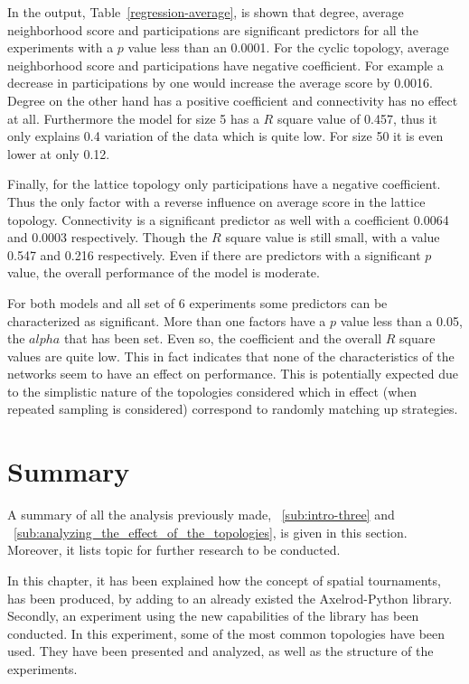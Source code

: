 In the output, Table~\ref{regression-average}, is shown that degree, average
neighborhood score and participations
are significant predictors for all the experiments with a \(p\) value less than
an 0.0001.
For the cyclic topology, average neighborhood score and participations have negative
coefficient. For example a decrease in participations by one would increase
the average score by 0.0016. Degree on the other hand has a positive coefficient
and connectivity has no effect at all. Furthermore the model for size 5 has
a \(R\) square value of 0.457, thus it only explains 0.4 variation of the data which is
quite low. For size 50 it is even lower at only 0.12.

Finally, for the lattice topology only participations have a negative coefficient.
Thus the only factor with a reverse influence on average score in the lattice topology.
Connectivity is a significant predictor as well with a coefficient 0.0064 and
0.0003 respectively. Though the \(R\) square value is still  small,
with a value 0.547 and 0.216 respectively.
Even if there are predictors with a significant \(p\) value, the overall
performance of the model is moderate.

For both models and all set of 6 experiments some predictors can be characterized
as significant. More than one factors have a \(p\) value less than a 0.05, the \(alpha\)
that has been set. Even so, the coefficient and the overall \(R\) square values are
quite low. This in fact indicates
that none of the characteristics of the networks seem to have an effect on
performance. This is potentially expected due to the simplistic nature of the
topologies considered which in effect (when repeated sampling is considered)
correspond to randomly matching up strategies.


\section{Summary}
\label{sub:summary}
A summary of all the analysis previously made, ~\autoref{sub:intro-three} and
~\autoref{sub:analyzing_the_effect_of_the_topologies}, is given in this section.
Moreover, it lists topic for further research to be conducted.

In this chapter, it has been explained how the concept of spatial tournaments,
has been produced, by adding to an already existed the Axelrod-Python library.
Secondly, an experiment using the new capabilities of the library has been
conducted. In this experiment, some of the most common topologies have been used.
They have been presented and analyzed, as well as the structure of the experiments.

